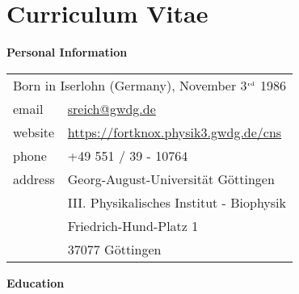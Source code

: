 \chapter*{Curriculum Vitae}
\pagestyle{empty}


\textbf{Personal Information}

\hspace{0.5cm}\begin{tabular}{ p{2.5cm} p{10.3cm} }
  \multicolumn{2}{l}{Born in Iserlohn (Germany), November 3$^{\textrm{\tiny rd}}$ 1986}\vspace{0.5cm}\\
  email & \href{mailto:sreich@gwdg.de}{sreich@gwdg.de}\\
  website & \href{https://fortknox.physik3.gwdg.de/cns/redir.php?p=reich}{https://fortknox.physik3.gwdg.de/cns}\\
  phone & +49 551 / 39 - 10764\\
  address & Georg-August-Universit\"at G\"ottingen\\
          & III. Physikalisches Institut - Biophysik\\
          & Friedrich-Hund-Platz 1\\
          & 37077 G\"ottingen\vspace{0.5cm}\\
\end{tabular}


\vspace{0.5cm}\textbf{Education}

